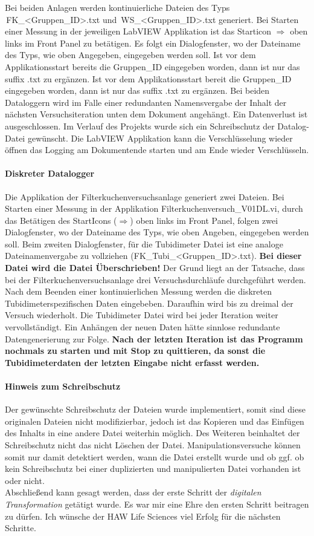 Bei beiden Anlagen werden kontinuierliche Dateien des Typs\\ {\Menlo \,FK\_<Gruppen\_ID>.txt} und {\Menlo \,WS\_<Gruppen\_ID>.txt} generiert. Bei Starten einer Messung in der jeweiligen LabVIEW Applikation ist das Starticon $\Rightarrow$ oben links im {\Hypatia Front Panel} zu betätigen. Es folgt ein Dialogfenster, wo der Dateiname des Typs, wie oben Angegeben, eingegeben werden soll. Ist vor dem Applikationsstart bereits die {\Menlo Gruppen\_ID} eingegeben worden, dann ist nur das suffix {\Hypatia .txt} zu ergänzen. Ist vor dem Applikationsstart bereit die {\Menlo Gruppen\_ID} eingegeben worden, dann ist nur das suffix {\Hypatia *.txt} zu ergänzen. Bei beiden Dataloggern wird im Falle einer redundanten Namensvergabe der Inhalt der nächsten Versuchsiteration unten dem Dokument angehängt. Ein Datenverlust ist ausgeschlossen. Im Verlauf des Projekts wurde sich ein Schreibschutz der Datalog-Datei gewünscht. Die LabVIEW Applikation kann die Verschlüsselung wieder öffnen das Logging am Dokumentende starten und am Ende wieder Verschlüsseln. 

\paragraph*{Diskreter Datalogger}
Die Applikation der Filterkuchenversuchsanlage generiert zwei Dateien. Bei Starten einer Messung in der Applikation {\Menlo Filterkuchenversuch\_V01DL.vi}, durch das Betätigen des StartIcons ($\Rightarrow$)  oben links im {\Hypatia Front Panel}, folgen zwei Dialogfenster, wo der Dateiname des Typs, wie oben Angeben, eingegeben werden soll. Beim zweiten Dialogfenster, für die Tubidimeter Datei ist eine analoge Dateinamenvergabe zu vollziehen ({\Menlo FK\_Tubi\_<Gruppen\_ID>.txt}). \textbf{Bei dieser Datei wird die Datei Überschrieben!} Der Grund liegt an der Tatsache, dass bei der Filterkuchenversuchsanlage drei Versuchsdurchläufe durchgeführt werden. Nach dem Beenden einer kontinuierlichen Messung werden die diskreten Tubidimeterspezifischen Daten eingebeben. Daraufhin wird bis zu dreimal der Versuch wiederholt. Die Tubidimeter Datei wird bei jeder Iteration weiter vervollständigt. Ein Anhängen der neuen Daten hätte sinnlose redundante Datengenerierung zur Folge. \textbf{Nach der letzten Iteration ist das Programm nochmals zu starten und mit Stop zu quittieren, da sonst die Tubidimeterdaten der letzten Eingabe nicht erfasst werden.} 

\paragraph*{Hinweis zum Schreibschutz}
Der gewünschte Schreibschutz der Dateien wurde implementiert, somit sind diese originalen Dateien nicht modifizierbar, jedoch ist das Kopieren und das Einfügen des Inhalts in eine andere Datei weiterhin möglich. Des Weiteren beinhaltet der Schreibschutz nicht das nicht Löschen der Datei. Manipulationsversuche können somit nur damit detektiert werden, wann die Datei erstellt wurde und ob ggf. ob kein Schreibschutz bei einer duplizierten und manipulierten Datei vorhanden ist oder nicht. \\



Abschließend kann gesagt werden, dass der erste Schritt der \textit{digitalen Transformation} getätigt wurde. Es war mir eine Ehre den ersten Schritt beitragen zu dürfen. Ich wünsche der HAW Life Sciences viel Erfolg für die nächsten Schritte.

